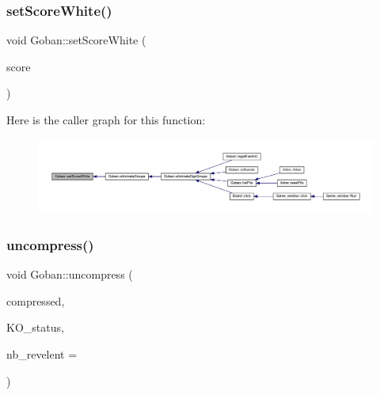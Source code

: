 \subsubsection{\texorpdfstring{set\+Score\+White()}{setScoreWhite()}}
{\footnotesize\ttfamily void Goban\+::set\+Score\+White (\begin{DoxyParamCaption}\item[{int}]{score }\end{DoxyParamCaption})}

Here is the caller graph for this function\+:
\nopagebreak
\begin{figure}[H]
\begin{center}
\leavevmode
\includegraphics[width=350pt]{class_goban_a1d3ccccfb3f539e0271ee321686d9ef4_icgraph}
\end{center}
\end{figure}
\mbox{\label{class_goban_aa23b735d8d72bb0fe189005e968e9329}} 
\subsubsection{\texorpdfstring{uncompress()}{uncompress()}}
{\footnotesize\ttfamily void Goban\+::uncompress (\begin{DoxyParamCaption}\item[{const uint8\+\_\+t $\ast$}]{compressed,  }\item[{const \hyperlink{class_etat_af3ddb2296ffc379b7f3ad2bf832f294e}{Etat\+::\+V\+AL}}]{K\+O\+\_\+status,  }\item[{int}]{nb\+\_\+revelent = {} }\end{DoxyParamCaption})}

